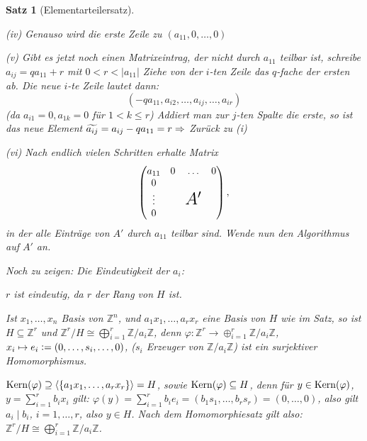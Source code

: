 \documentclass[a4paper,10pt,german]{scrbook}
\theoremstyle{saetze}
\newtheorem{Satz}{Satz}
\theoremstyle{definitionen}
\begin{document}
\begin{Satz}[Elementarteilersatz]
{\begin{enum}
            \item[(iv)] Genauso wird die erste Zeile zu $(a_{11}, 0, \dots, 0)$
            
            \item[(v)] Gibt es jetzt noch einen Matrixeintrag, der nicht durch 
            $a_{11}$ teilbar ist, schreibe $a_{ij} = q a_{11} + r$ mit $0 < r <
            |a_{11}|$ Ziehe von der $i$-ten Zeile das $q$-fache der ersten ab. 
            Die neue $i$-te Zeile lautet dann: \[(-q a_{11}, a_{i2}, \dots, 
            a_{ij}, \dots, a_{ir})\] (da $a_{i1} = 0, a_{1k} = 0$ für $1<k\leq
            r$) \newline
            Addiert man zur $j$-ten Spalte die erste, so ist das neue Element
            $\widetilde{a_{ij}} = a_{ij} - q a_{11} = r \Rightarrow$ Zurück zu (i)
            
            \item[(vi)] Nach endlich vielen Schritten erhalte Matrix 
            \[\begin{pmatrix} a_{11} & 0 & \hdots & 0 \\ 0 \\ \vdots &  & 
            \mbox{\LARGE $A'$}\\ 0 \end{pmatrix},\] in der alle Einträge von
            $A'$ durch $a_{11}$ teilbar sind. Wende nun den Algorithmus auf $A'$ an.
        \end{enum}


        Noch zu zeigen: Die Eindeutigkeit der $a_i$:

	$r$ ist eindeutig, da $r$ der Rang von $H$ ist.

	Ist $x_1,\ldots,x_n$ Basis von $\mathbb Z^n$, und $a_1x_1,\ldots,a_rx_r$ eine Basis
	von $H$ wie im Satz, so ist $H \subseteq \mathbb Z^r$ und $\mathbb Z^r/H \cong
	\bigoplus_{i=1}^r \mathbb Z/ a_i\mathbb Z$, denn $\varphi : \mathbb Z^r\to \oplus_{i=1}^r \mathbb Z/a_i\mathbb Z$, $x_i\mapsto e_i\mathrel{\mathop:}= (0,\ldots,s_i,\ldots,0)$, ($s_i$ Erzeuger von $\mathbb Z/a_i\mathbb Z$) ist ein surjektiver Homomorphismus. 

	$\mathop{\rm Kern}\nolimits(\varphi) \supseteq \langle\{a_1 x_1,\ldots,a_rx_r\}\rangle = H$, sowie $\mathop{\rm Kern}\nolimits(\varphi) \subseteq H$, denn für $y\in \mathop{\rm Kern}\nolimits(\varphi)$, $y=\sum_{i=1}^r b_ix_i$ gilt: $\varphi(y) = \sum_{i=1}^r b_i e_i = (b_1s_1,\ldots,b_rs_r) = (0,\ldots,0)$, also gilt $a_i\mid b_i$, $i=1,\ldots,r$, also $y\in H$. Nach dem Homomorphiesatz gilt also: $\mathbb Z^r/H \cong
	\bigoplus_{i=1}^r \mathbb Z/ a_i\mathbb Z$.

}
\end{Satz}
\end{document}
